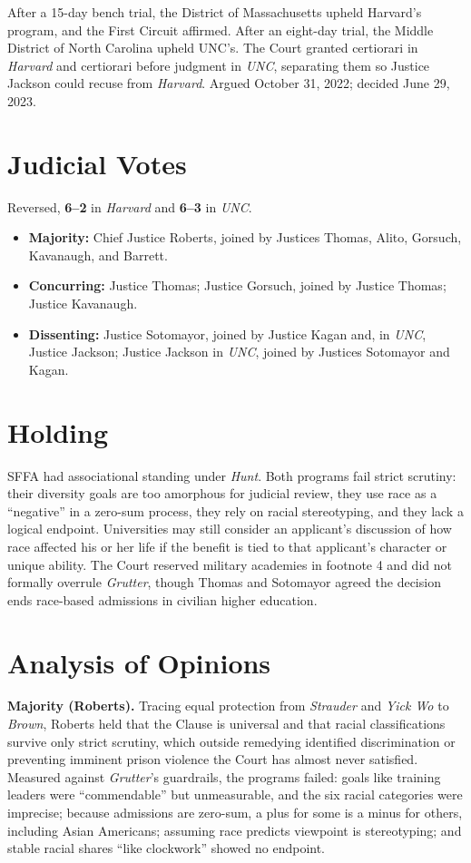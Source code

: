 \documentclass[12pt]{article}
\begin{document}
After a 15-day bench trial, the District of Massachusetts upheld Harvard's program, and the First Circuit affirmed. After an eight-day trial, the Middle District of North Carolina upheld UNC's. The Court granted certiorari in \textit{Harvard} and certiorari before judgment in \textit{UNC}, separating them so Justice Jackson could recuse from \textit{Harvard}. Argued October 31, 2022; decided June 29, 2023.

\section{Judicial Votes}

Reversed, \textbf{6--2} in \textit{Harvard} and \textbf{6--3} in \textit{UNC}.
\begin{itemize}
\item \textbf{Majority:} Chief Justice Roberts, joined by Justices Thomas, Alito, Gorsuch, Kavanaugh, and Barrett.
\item \textbf{Concurring:} Justice Thomas; Justice Gorsuch, joined by Justice Thomas; Justice Kavanaugh.
\item \textbf{Dissenting:} Justice Sotomayor, joined by Justice Kagan and, in \textit{UNC}, Justice Jackson; Justice Jackson in \textit{UNC}, joined by Justices Sotomayor and Kagan.
\end{itemize}

\section{Holding}

SFFA had associational standing under \textit{Hunt}. Both programs fail strict scrutiny: their diversity goals are too amorphous for judicial review, they use race as a ``negative'' in a zero-sum process, they rely on racial stereotyping, and they lack a logical endpoint. Universities may still consider an applicant's discussion of how race affected his or her life if the benefit is tied to that applicant's character or unique ability. The Court reserved military academies in footnote 4 and did not formally overrule \textit{Grutter}, though Thomas and Sotomayor agreed the decision ends race-based admissions in civilian higher education.

\section{Analysis of Opinions}

\textbf{Majority (Roberts).} Tracing equal protection from \textit{Strauder} and \textit{Yick Wo} to \textit{Brown}, Roberts held that the Clause is universal and that racial classifications survive only strict scrutiny, which outside remedying identified discrimination or preventing imminent prison violence the Court has almost never satisfied. Measured against \textit{Grutter}'s guardrails, the programs failed: goals like training leaders were ``commendable'' but unmeasurable, and the six racial categories were imprecise; because admissions are zero-sum, a plus for some is a minus for others, including Asian Americans; assuming race predicts viewpoint is stereotyping; and stable racial shares ``like clockwork'' showed no endpoint.
\end{document}
